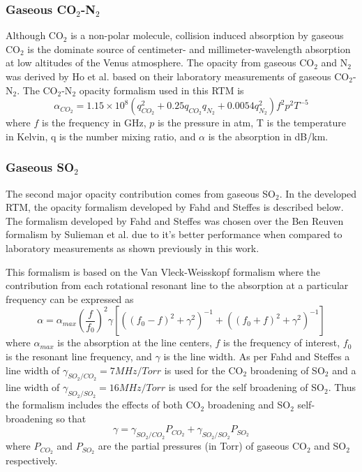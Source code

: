 \subsubsection{Gaseous CO$_2$-N$_2$}
Although CO$_2$ is a non-polar molecule, collision induced absorption by gaseous CO$_2$ \cite{Barrett-1960} is the dominate source of centimeter- and millimeter-wavelength absorption at low altitudes of the Venus atmosphere. The opacity from gaseous CO$_2$ and N$_2$  was derived by Ho et al. \cite{Ho-1966} based on their laboratory measurements of gaseous CO$_2$-N$_2$. The CO$_2$-N$_2$ opacity formalism used in this RTM is
\begin{equation}\label{eq:rtm-co2n2}
\alpha_{CO_2} = 1.15\times 10^8(q_{CO_2}^2 + 0.25q_{CO_2}q_{N_2} + 0.0054q_{N_2}^2)f^2p^2T^{-5}
\end{equation}
where $f$ is the frequency in GHz, $p$ is the pressure in atm, T is the temperature in Kelvin, q is the number mixing ratio, and $\alpha$ is the absorption in dB/km.

\subsubsection{Gaseous SO$_2$}
The second major opacity contribution comes from gaseous SO$_2$. In the developed RTM, the opacity formalism developed by Fahd and Steffes \cite{Fahd-1991} is described below. The formalism developed by Fahd and Steffes was chosen over the Ben Reuven formalism by Sulieman et al. \cite{Suleiman-1996} due to it's better performance when compared to laboratory measurements as shown previously in this work.

This formalism is based on the Van Vleck-Weisskopf formalism where the contribution from each rotational resonant line to the absorption at a particular frequency can be expressed as 
\begin{equation}
\label{eq:rtm-so2fahd}
\alpha = \alpha_{max} \left(\frac{f}{f_0}\right)^2 \gamma [((f_0-f)^2+\gamma^2)^{-1}+((f_0+f)^2 + \gamma^2)^{-1}]
\end{equation}
where $\alpha_{max}$ is the absorption at the line centers, $f$ is the frequency of interest, $f_0$ is the resonant line frequency, and $\gamma$ is the line width. As per Fahd and Steffes \cite{Fahd-1991} a line width of $\gamma_{SO_2/CO_2} = 7MHz/Torr$ is used for the CO$_2$ broadening of SO$_2$ and a line width of $\gamma_{SO_2/SO_2} = 16MHz/Torr$ is used for the self broadening of SO$_2$. Thus the formalism includes the effects of both CO$_2$ broadening and SO$_2$ self-broadening so that
\begin{equation}
\gamma = \gamma_{SO_2/CO_2}P_{CO_2} + \gamma_{SO_2/SO_2}P_{SO_2}
\end{equation}
where $P_{CO_2}$ and $P_{SO_2}$ are the partial pressures (in Torr) of gaseous CO$_2$ and SO$_2$ respectively.

